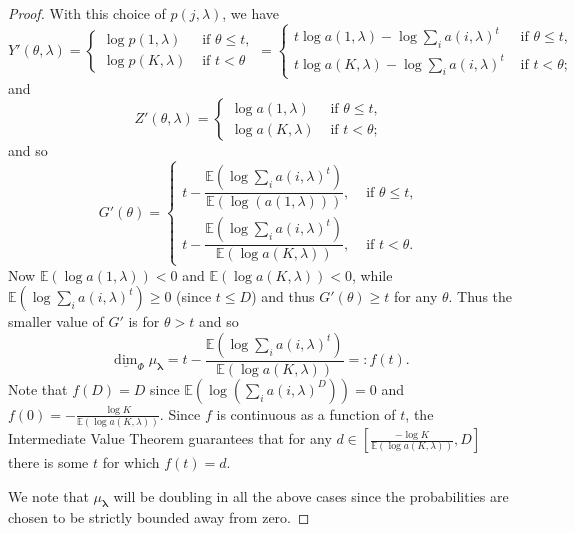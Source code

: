 \documentclass{amsart}
\theoremstyle{plain}
\numberwithin{equation}{section}
\newcommand{\blambda}{{\boldsymbol{\lambda}}}
\newcommand{\ee}{{\mathbb E}}
\newcommand{\udim}{\underline{\dim}}
\begin{document}
\begin{proof}
With this choice of $p(j,\lambda)$, we have 
\begin{equation*}
  Y'(\theta,\lambda)=\begin{cases}
          \log p(1,\lambda) & \text{ if }\theta \leq t, \\ 
          \log p(K,\lambda) & \text{ if }t<\theta 
     \end{cases}
     =
    \begin{cases}
         t\log a(1,\lambda)-\log \sum_{i} a(i,\lambda)^t & \text{ if }\theta \leq t, \\ 
         t\log a(K,\lambda)-\log \sum_{i} a(i,\lambda)^{t} & \text{ if }t<\theta ;
   \end{cases}
\end{equation*}
and
\begin{equation*}
    Z'(\theta,\lambda)=\begin{cases}
           \log a(1,\lambda) & \text{ if }\theta \leq t, \\ 
           \log a(K,\lambda) & \text{ if }t<\theta ;
    \end{cases}
\end{equation*}
and so 
\begin{equation*}
    G'(\theta)=  \begin{cases}
               t-\dfrac{\ee(\log \sum_{i} a(i,\lambda)^{t})}{\ee(\log (a(1,\lambda)))}, & \text{ if }\theta \leq t, \\[10pt]
               t-\dfrac{\ee(\log \sum_{i} a(i,\lambda)^{t})}{\ee(\log a(K,\lambda))}, & \text{ if }t<\theta.
    \end{cases}
\end{equation*}
Now $\ee(\log a(1,\lambda))<0$ and $\ee(\log a(K,\lambda))<0$, while ${\ee}(\log \sum_{i} a(i,\lambda )^{t})\geq 0$ (since $t\leq D$) and 
thus $G'(\theta)\geq t$ for any $\theta $. 
Thus  the smaller value of $G'$ is for $\theta > t$ and so
\begin{equation*}
    \udim_{\Phi}\mu_\blambda=t-\frac{\ee(\log \sum_{i} a(i,\lambda)^{t})}{\ee(\log a(K,\lambda))}=:f(t).
\end{equation*}
Note that $f(D)=D$ since $\ee(\log (\sum_{i} a(i,\lambda)^{D}))=0$ and $f(0)=-\frac{\log K}{\ee(\log a(K,\lambda))}$. 
Since $f$ is continuous as a function of $t$, the Intermediate Value Theorem guarantees that for any 
$d\in \displaystyle[\frac{-\log K}{\ee(\log a(K,\lambda))},D]$ there is some $t$ for which $f(t)=d$.

We note that $\mu_\blambda$ will be doubling in all the above cases since the probabilities are chosen to be strictly bounded away from zero.
\end{proof}
\end{document}
